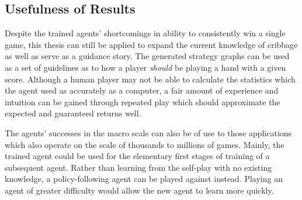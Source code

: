 
\subsection{Usefulness of Results}
\label{sec:disc-usefulness}


Despite the trained agents' shortcomings in ability to consistently win
a single game,
this thesis can still be applied to expand the current
knowledge of cribbage as well as serve as a guidance story.
%
The generated strategy graphs can be used as a set of guidelines as to how a
player \textit{should} be playing a hand with a given score.
%
Although a human player may not be able to calculate the statistics which the
agent used as accurately as a computer,
a fair amount of experience and intuition can be gained through repeated
play which should approximate the expected and guaranteed returns well.

The agents' successes in the macro scale can also be of use to those
applications which also operate on the scale of thousands to millions of games.
%
Mainly,
the trained agent could be used for the elementary first stages of training
of a subsequent agent.
%
Rather than learning from the self-play with no existing knowledge,
a policy-following agent can be played against instead.
%
Playing an agent of greater difficulty would allow the
new agent to learn more quickly.





%

